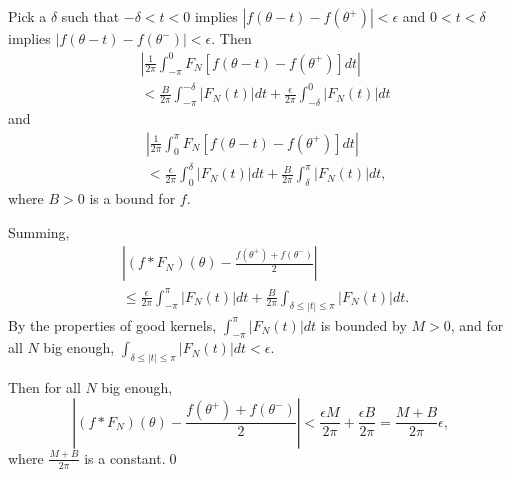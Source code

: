 \documentclass[oneside]{article}
\newcommand\abs[1]{\left|#1\right|}
\begin{document}
\begin{enumerate}[label=(\alph*)]
    Pick a $\delta$ such that $-\delta < t < 0$ implies $\abs{f(\theta - t) - f(\theta^+)} < \epsilon$ and $0 < t < \delta$ implies $\abs{f(\theta - t) - f(\theta^-)} < \epsilon$. Then \begin{align*}
      &\abs{\frac{1}{2\pi} \int_{-\pi}^0 F_N \left[f(\theta - t) - f(\theta^+) \right]dt} \\
      &< \frac{B}{2\pi}\int_{-\pi}^{-\delta}\abs{F_N(t)}dt + \frac{\epsilon}{2\pi} \int_{-\delta}^0 \abs{F_N(t)}dt
    \end{align*} and \begin{align*}
      &\abs{\frac{1}{2\pi} \int_0^\pi F_N \left[f(\theta - t) - f(\theta^+) \right]dt} \\
      &< \frac{\epsilon}{2\pi} \int_0^\delta \abs{F_N(t)}dt + \frac{B}{2\pi}\int_\delta^\pi\abs{F_N(t)}dt \text{,}
    \end{align*} where $B>0$ is a bound for $f$.

    Summing,\begin{align*}
      &\abs{(f * F_N)(\theta) - \frac{f(\theta^+) + f(\theta^-)}{2}} \\
      &\leq \frac{\epsilon}{2\pi}\int_{-\pi}^\pi \abs{F_N(t)}dt
      + \frac{B}{2\pi}\int_{\delta \leq \abs{t} \leq \pi} \abs{F_N(t)} dt \text{.}
    \end{align*} By the properties of good kernels, $\int_{-\pi}^\pi \abs{F_N(t)}dt$ is bounded by $M>0$, and for all $N$ big enough, $\int_{\delta\leq\abs{t}\leq\pi}\abs{F_N(t)}dt < \epsilon$.

    Then for all $N$ big enough,\[
      \abs{(f * F_N)(\theta) - \frac{f(\theta^+) + f(\theta^-)}{2}}
        < \frac{\epsilon M}{2\pi} + \frac{\epsilon B}{2\pi}
        = \frac{M + B}{2\pi}\epsilon \text{,}
    \] where $\frac{M + B}{2\pi}$ is a constant.\qed
  \end{enumerate}
\end{document}
